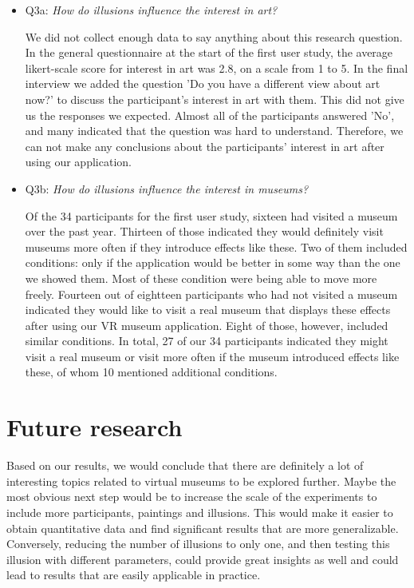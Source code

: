 \documentclass[a4paper]{article}
\begin{document}
\begin{itemize}
\item Q3a: \emph{How do illusions influence the interest in art?}

We did not collect enough data to say anything about this research question. In the general questionnaire at the start of the first user study, the average likert-scale score for interest in art was 2.8, on a scale from 1 to 5. In the final interview we added the question 'Do you have a different view about art now?' to discuss the participant's interest in art with them. This did not give us the responses we expected. Almost all of the participants answered 'No', and many indicated that the question was hard to understand. Therefore, we can not make any conclusions about the participants' interest in art after using our application.

\item Q3b: \emph{How do illusions influence the interest in museums?}

Of the 34 participants for the first user study, sixteen had visited a museum over the past year. Thirteen of those indicated they would definitely visit museums more often if they introduce effects like these. Two of them included conditions: only if the application would be better in some way than the one we showed them. Most of these condition were being able to move more freely. Fourteen out of eightteen participants who had not visited a museum indicated they would like to visit a real museum that displays these effects after using our VR museum application. Eight of those, however, included similar conditions. In total, 27 of our 34 participants indicated they might visit a real museum or visit more often if the museum introduced effects like these, of whom 10 mentioned additional conditions.

\end{itemize}


\section{Future research}

Based on our results, we would conclude that there are definitely a lot of interesting topics related to virtual museums to be explored further. Maybe the most obvious next step would be to increase the scale of the experiments to include more participants, paintings and illusions. This would make it easier to obtain quantitative data and find significant results that are more generalizable. Conversely, reducing the number of illusions to only one, and then testing this illusion with different parameters, could provide great insights as well and could lead to results that are easily applicable in practice.
\end{document}
